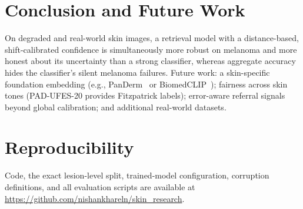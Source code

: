 \documentclass[conference]{IEEEtran}
\begin{document}
\section{Conclusion and Future Work}
On degraded and real-world skin images, a retrieval model with a distance-based,
shift-calibrated confidence is simultaneously more robust on melanoma and more
honest about its uncertainty than a strong classifier, whereas aggregate
accuracy hides the classifier's silent melanoma failures. Future work: a
skin-specific foundation embedding (e.g., PanDerm~\cite{yan2025panderm} or
BiomedCLIP~\cite{zhang2025biomedclip}); fairness across skin tones (PAD-UFES-20
provides Fitzpatrick labels); error-aware referral signals beyond global
calibration; and additional real-world datasets.

\section*{Reproducibility}
Code, the exact lesion-level split, trained-model configuration, corruption
definitions, and all evaluation scripts are available at
\url{https://github.com/nishankhareln/skin_research}.
\end{document}
